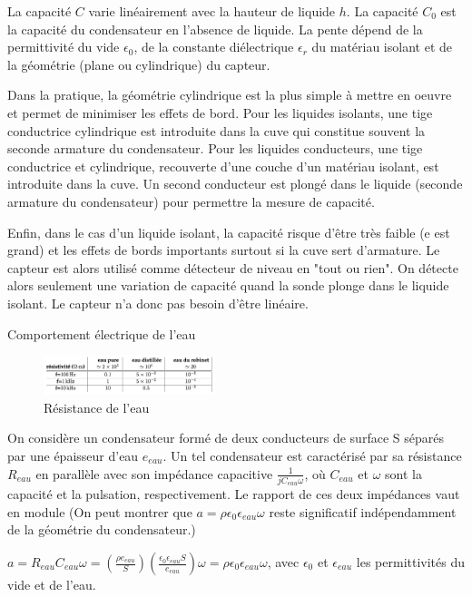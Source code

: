 \documentclass{article}%
\begin{document}
La capacité $C$ varie linéairement avec la hauteur de liquide $h$. La capacité $C_{0}$ est la capacité du condensateur en l'absence de liquide. La pente dépend de la permittivité du vide $\epsilon_{0}$, de la constante diélectrique $\epsilon_{r}$ du matériau isolant et de la géométrie (plane ou cylindrique) du capteur.

Dans la pratique, la géométrie cylindrique est la plus simple à mettre en oeuvre et permet de minimiser les effets de bord. Pour les liquides isolants, une tige conductrice cylindrique est introduite dans la cuve qui constitue souvent la seconde armature du condensateur. Pour les liquides conducteurs, une tige conductrice et cylindrique, recouverte d'une couche d'un matériau isolant, est introduite dans la cuve. Un second conducteur est plongé dans le liquide (seconde armature du condensateur) pour permettre la mesure de capacité.

Enfin, dans le cas d'un liquide isolant, la capacité risque d'être très faible (e est grand) et les effets de bords importants surtout si la cuve sert d'armature. Le capteur est alors utilisé comme détecteur de niveau en "tout ou rien". On détecte alors seulement une variation de capacité quand la sonde plonge dans le liquide isolant. Le capteur n'a donc pas besoin d'être linéaire. 

Comportement électrique de l'eau
\begin{figure}
	\centerline{\includegraphics[width=5cm]{images-exp/Tableau_resistivite_eau.png}}
	\caption{Résistance de l'eau}
\end{figure}

On considère un condensateur formé de deux conducteurs de surface S séparés par une épaisseur d'eau $e_{eau}$. Un tel condensateur est caractérisé par sa résistance $R_{eau}$ en parallèle avec son impédance capacitive $\frac{1}{jC_{eau}\omega}$, où $C_{eau}$ et $\omega$ sont la capacité et la pulsation, respectivement. Le rapport de ces deux impédances vaut en module (On peut montrer que $a=\rho \epsilon_{0}\epsilon_{eau} \omega$ reste significatif indépendamment de la géométrie du condensateur.)

$a=R_{eau}C_{eau}\omega=(\frac{\rho e_{eau}}{S})(\frac{\epsilon_{0}\epsilon_{eau}S}{e_{eau}})\omega=\rho \epsilon_{0}\epsilon_{eau} \omega$, avec $\epsilon_{0}$ et $\epsilon_{eau}$ les permittivités du vide et de l'eau.
\end{document}
